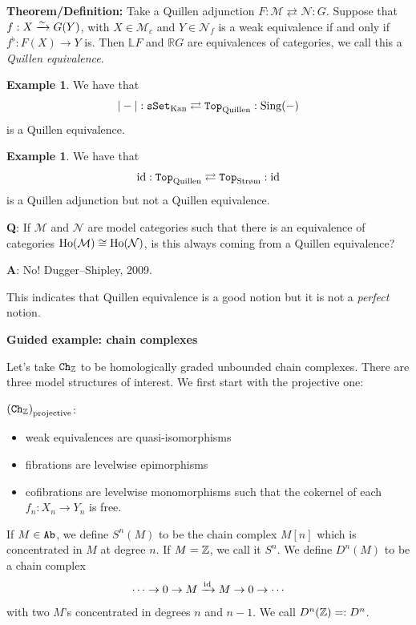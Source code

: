 \documentclass[12pt]{amsart}
\theoremstyle{definition}
\newtheorem{example}[theorem]{Example}
\begin{document}
\textbf{Theorem/Definition:} Take a Quillen adjunction $F: \mathcal{M} \rightleftarrows \mathcal{N}: G$. Suppose that $f: X \xrightarrow{\sim} G(Y)$, with $X\in \mathcal{M}_c$ and $Y\in \mathcal{N}_f$ is a weak equivalence if and only if $f^\flat:F(X) \to Y$ is. Then $\mathbb{L}F$ and $\mathbb{R}G$ are equivalences of categories, we call this a \textit{Quillen equivalence}.

\begin{example} We have that
\begin{align*}
    |-|:\texttt{sSet}_\text{Kan} \rightleftarrows \texttt{Top}_\text{Quillen}: \text{Sing}(-)
\end{align*}
is a Quillen equivalence.
\end{example}

\begin{example} We have that
\begin{align*}
    \id: \Top_\text{Quillen} \rightleftarrows \Top_\text{Str{\o}m}:\id
\end{align*}
is a Quillen adjunction but not a Quillen equivalence.
\end{example}

\textbf{Q}: If $\mathcal{M}$ and $\mathcal{N}$ are model categories such that there is an equivalence of categories $\text{Ho}(\mathcal{M}) \cong \text{Ho}(\mathcal{N})$, is this always coming from a Quillen equivalence?

\textbf{A}: No! Dugger--Shipley, 2009.

This indicates that Quillen equivalence is a good notion but it is not a \textit{perfect} notion.

\begin{center}
    \textbf{Guided example: chain complexes}
\end{center}

Let's take $\texttt{Ch}_{\mathbb{Z}}$ to be homologically graded unbounded chain complexes. There are three model structures of interest. We first start with the projective one:

$\left( \texttt{Ch}_{\mathbb{Z}} \right)_\text{projective}$:
\begin{itemize}
    \item weak equivalences are quasi-isomorphisms
    \item fibrations are levelwise epimorphisms
    \item cofibrations are levelwise monomorphisms such that the cokernel of each $f_n:X_n \to Y_n$ is free.
\end{itemize}

If $M \in \texttt{Ab}$, we define $S^n(M)$ to be the chain complex $M[n]$ which is concentrated in $M$ at degree $n$. If $M=\mathbb{Z}$, we call it $S^n$. We define $D^n(M)$ to be a chain complex
\begin{align*}
    \cdots \to 0 \to M \xrightarrow{\text{id}} M \to 0\to \cdots
\end{align*}
with two $M$'s concentrated in degrees $n$ and $n-1$. We call $D^n(\mathbb{Z})=:D^n$.
\end{document}
